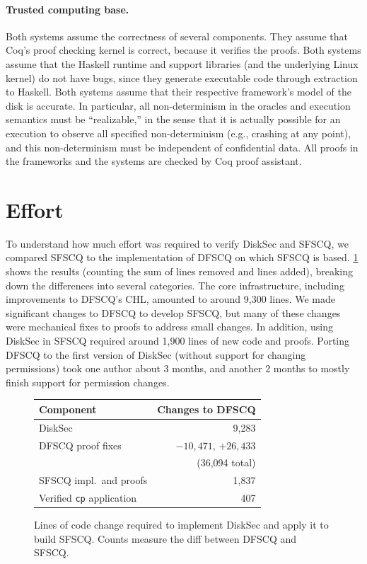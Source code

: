 \paragraph{Trusted computing base.}

Both systems assume the correctness of several components.  They assume
that Coq's proof checking kernel is correct, because it verifies
the proofs. Both systems assume that the Haskell runtime and support
libraries (and the underlying Linux kernel) do not have bugs, since
they generate executable code through extraction to Haskell. Both systems
assume that their respective framework's model of the disk is accurate.  In particular, all
non-determinism in the oracles and execution semantics must be ``realizable,''
in the sense that it is actually possible for an execution to observe
all specified non-determinism (e.g., crashing at any point), and this
non-determinism must be independent of confidential data.  All proofs in the frameworks and the systems are checked by Coq proof assistant.


\section{Effort}


To understand how much effort was required to verify DiskSec and SFSCQ, we
compared SFSCQ to the implementation of DFSCQ on which SFSCQ is based.
\ref{fig:loc} shows the results (counting the sum of lines removed and lines
added), breaking down the differences into several categories.  The core
infrastructure, including improvements to DFSCQ's CHL, amounted to around
9,300 lines.  We made significant changes to DFSCQ to develop SFSCQ, but many
of these changes were mechanical fixes to proofs to address small changes. In
addition, using DiskSec in SFSCQ required around 1,900 lines of new code and proofs.
Porting DFSCQ to the first version of DiskSec (without support for changing
permissions) took one author about 3 months, and another 2 months to
mostly finish support for permission changes.

\begin{figure}[H]
  \centering
  \begin{tabular}{lr}
    \hline
    \textbf{Component} & \textbf{Changes to DFSCQ} \\
    \hline
    DiskSec & 9,283 \\
    DFSCQ proof fixes & $-10,471$, $+26,433$ \\
    & \quad (36,094 total) \\
    SFSCQ impl.\ and proofs & 1,837 \\
    Verified \texttt{cp} application & 407 \\
    \hline
  \end{tabular}
  \caption{Lines of code change required to implement DiskSec and apply it to build
    SFSCQ. Counts measure the diff between DFSCQ and SFSCQ.}
  \label{fig:loc}
\end{figure}


